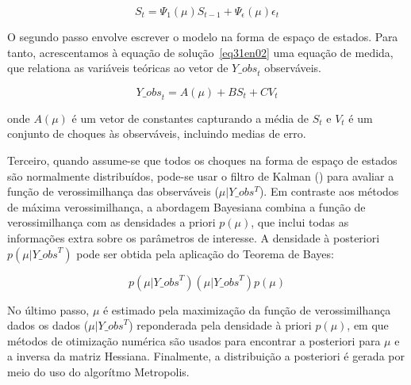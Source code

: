 \documentclass[twoside,a4paper,11pt]{report}
\begin{document}
\begin{equation}\label{eq31en02}
{S}_{t}={\Psi}_{1}(\mu){S}_{t-1}+{\Psi}_{\epsilon}(\mu){\epsilon}_{t}
\end{equation}

O segundo passo envolve escrever o modelo na forma de espaço de estados. Para tanto, acrescentamos à equação de solução~\ref{eq31en02} uma equação de medida, que relationa as variáveis teóricas ao vetor de ${Y\_ obs}_{t}$ observáveis. 

\begin{equation}\label{eq32en02}
{Y\_ obs}_{t}=A(\mu)+B{S}_{t}+{CV}_{t}
\end{equation}

\noindent onde $A(\mu)$ é um vetor de constantes capturando a média de $S_{t}$ e $V_{t}$ é um conjunto de choques às observáveis, incluindo medias de erro. 

Terceiro, quando assume-se que todos os choques na forma de espaço de estados são normalmente distribuídos, pode-se usar o filtro de Kalman (\citet{sargent1989two}) para avaliar a função de verossimilhança das observáveis ($\mu|Y\_ obs^{T}$). Em contraste aos métodos de máxima verossimilhança, a abordagem Bayesiana combina a função de verossimilhança com as densidades a priori $p(\mu)$, que inclui todas as informações extra sobre os parâmetros de interesse. A densidade à posteriori $p(\mu |{Y\_ obs}^{T})$ pode ser obtida pela aplicação do Teorema de Bayes:

\begin{equation}\label{eq33en02}
p(\mu |{Y\_ obs}^{T})(\mu |{Y\_ obs}^{T})p(\mu) 
\end{equation}

No último passo, $\mu$ é estimado pela maximização da função de verossimilhança dados os dados ($\mu |{Y\_ obs}^{T}$) reponderada pela densidade à priori $p(\mu)$, em que métodos de otimização numérica são usados para encontrar a posteriori para $\mu$ e a inversa da matriz Hessiana. Finalmente, a distribuição a posteriori é gerada por meio do uso do algorítmo Metropolis.









\end{document}
